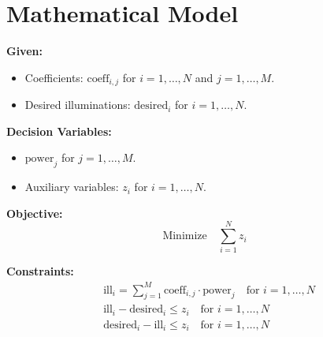 \documentclass{article}
\begin{document}
\section*{Mathematical Model}

\textbf{Given:}
\begin{itemize}
    \item Coefficients: $\text{coeff}_{i,j}$ for $i = 1, \ldots, N$ and $j = 1, \ldots, M$.
    \item Desired illuminations: $\text{desired}_i$ for $i = 1, \ldots, N$.
\end{itemize}

\textbf{Decision Variables:}
\begin{itemize}
    \item $\text{power}_j$ for $j = 1, \ldots, M$.
    \item Auxiliary variables: $z_i$ for $i = 1, \ldots, N$.
\end{itemize}

\textbf{Objective:}
\[
\text{Minimize} \quad \sum_{i=1}^{N} z_i
\]

\textbf{Constraints:}
\[
\begin{align*}
& \text{ill}_i = \sum_{j=1}^{M} \text{coeff}_{i,j} \cdot \text{power}_j \quad \text{for } i = 1, \ldots, N \\
& \text{ill}_i - \text{desired}_i \leq z_i \quad \text{for } i = 1, \ldots, N \\
& \text{desired}_i - \text{ill}_i \leq z_i \quad \text{for } i = 1, \ldots, N
\end{align*}
\]
\end{document}
